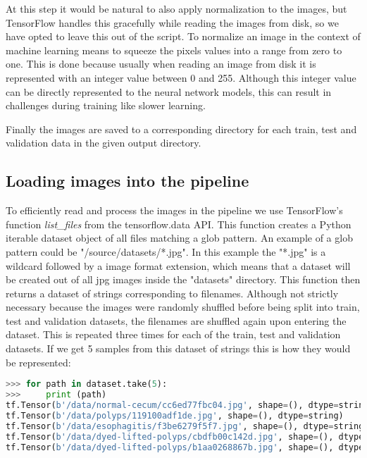 \documentclass[thesis.tex]{subfiles}
\begin{document}
At this step it would be natural to also apply normalization to the images, but TensorFlow handles this gracefully while reading the images from disk, so we have opted to leave this out of the script. To normalize an image in the context of machine learning means to squeeze the pixels values into a range from zero to one. This is done because usually when reading an image from disk it is represented with an integer value between 0 and 255. Although this integer value can be directly represented to the neural network models, this can result in challenges during training like slower learning.

Finally the images are saved to a corresponding directory for each train, test and validation data in the given output directory.


\subsection{Loading images into the pipeline}
To efficiently read and process the images in the pipeline we use TensorFlow's function \textit{list\_files} from the tensorflow.data API. This function creates a Python iterable dataset object of all files matching a glob pattern. An example of a glob pattern could be "/source/datasets/*.jpg". In this example the "*.jpg" is a wildcard followed by a image format extension, which means that a dataset will be created out of all jpg images inside the "datasets" directory. This function then returns a dataset of strings corresponding to filenames. Although not strictly necessary because the images were randomly shuffled before being split into train, test and validation datasets, the filenames are shuffled again upon entering the dataset. This is repeated three times for each of the train, test and validation datasets. If we get 5 samples from this dataset of strings this is how they would be represented:

\begin{lstlisting}[language=Python]
>>> for path in dataset.take(5):
>>> 	print (path)
tf.Tensor(b'/data/normal-cecum/cc6ed77fbc04.jpg', shape=(), dtype=string)
tf.Tensor(b'/data/polyps/119100adf1de.jpg', shape=(), dtype=string)
tf.Tensor(b'/data/esophagitis/f3be6279f5f7.jpg', shape=(), dtype=string)
tf.Tensor(b'/data/dyed-lifted-polyps/cbdfb00c142d.jpg', shape=(), dtype=string)
tf.Tensor(b'/data/dyed-lifted-polyps/b1aa0268867b.jpg', shape=(), dtype=string)
\end{lstlisting}
\end{document}
